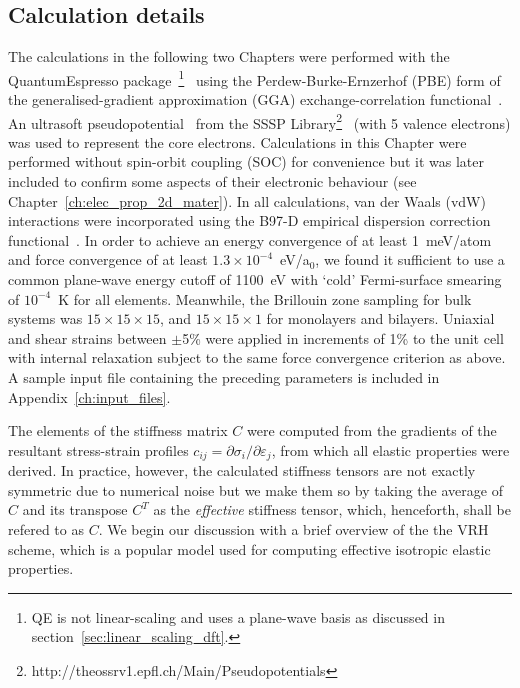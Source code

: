 \subsection{Calculation details}
\label{sec:calc_details}
%
The calculations in the following two Chapters 
were performed with the 
{\sc QuantumEspresso} 
package~\footnote{QE is not linear-scaling and uses a plane-wave 
basis as discussed in section~\ref{sec:linear_scaling_dft}.}~\cite{0953-8984-21-39-395502}
using the Perdew-Burke-Ernzerhof (PBE)  form of 
the generalised-gradient approximation (GGA) 
exchange-correlation functional~\cite{PhysRevLett.77.3865}. 
%
An ultrasoft pseudopotential~\cite{PhysRevB.41.7892}
from the SSSP Library\footnote{http://theossrv1.epfl.ch/Main/Pseudopotentials}~\cite{kucukbenli2014projector} 
(with 5 valence electrons) was used 
to represent the core electrons.
%
Calculations in this Chapter 
were performed without spin-orbit coupling (SOC)
for convenience but it was later 
included to confirm some aspects of their electronic behaviour 
(see Chapter~\ref{ch:elec_prop_2d_mater}).
%
In all calculations, van der Waals (vdW) interactions 
were incorporated using the B97-D empirical 
dispersion correction functional~\cite{JCC:JCC20495}. 
%
In order to achieve 
an energy convergence of at least 1~meV/atom 
and force convergence of at least $1.3\times 10^{-4}$~eV/a$_0$, 
we found it sufficient to use a common 
plane-wave energy cutoff of 1100~eV
with `cold' Fermi-surface smearing~\cite{PhysRevLett.82.3296} 
of $10^{-4}$~K for all elements.
%
Meanwhile, 
the Brillouin zone sampling for bulk systems
was $15\times15\times15$, 
and $15\times15\times1$ 
for monolayers and bilayers.
%
Uniaxial and shear strains 
between $\pm$5\% were applied 
in increments of 1\% to the unit cell 
with internal relaxation subject 
to the same force convergence 
criterion as above.
%
A sample input file containing the 
preceding parameters is included in Appendix~\ref{ch:input_files}.

%
The elements of the stiffness matrix $C$ 
were computed from the gradients of the 
resultant stress-strain profiles 
$c_{ij} = \partial \sigma_i/\partial\varepsilon_j$, 
from which all elastic properties were derived.
%
In practice, however, 
the calculated stiffness tensors 
are not exactly symmetric 
due to numerical noise 
but we make them so by taking 
the average of $C$ and its transpose $C^T$ 
as the \emph{effective} stiffness tensor, 
which, henceforth, 
shall be refered to as $C$.
%
We begin our discussion with 
a brief overview of the the 
VRH scheme, 
which is a popular model 
used for computing effective isotropic 
elastic properties.  

